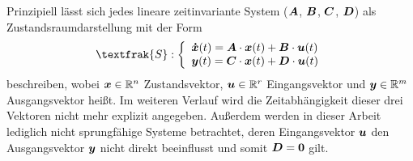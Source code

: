 Prinzipiell lässt sich jedes lineare zeitinvariante System 
($\boldsymbol{A}$, $\boldsymbol{B}$, $\boldsymbol{C}$, $\boldsymbol{D}$) als Zustandsraumdarstellung mit der Form
\begin{equation}
\textfrak{S} 
: \left\{ \begin{array}{ll}
\bs{\dot{x}}(t) = \bs{A}\cdot \bs{x}(t) + \bs{B}\cdot \bs{u}(t) \\
\bs{y}(t) = \bs{C}\cdot \bs{x}(t) + \bs{D}\cdot \bs{u}(t)
\end{array}
\right.
\end{equation}
beschreiben, wobei $\boldsymbol{x} \in \mathbb{R}^n$ Zustandsvektor, $\boldsymbol{u} \in \mathbb{R}^r$ Eingangsvektor und $\boldsymbol{y} \in \mathbb{R}^m$ Ausgangsvektor heißt. Im weiteren Verlauf wird die Zeitabhängigkeit dieser drei Vektoren nicht mehr explizit angegeben. Außerdem werden in dieser Arbeit lediglich nicht sprungfähige Systeme  betrachtet, deren Eingangsvektor $\boldsymbol{u}$ den Ausgangsvektor $\boldsymbol{y}$ nicht direkt beeinflusst und somit $\boldsymbol{D} = \boldsymbol{0}$ gilt.

